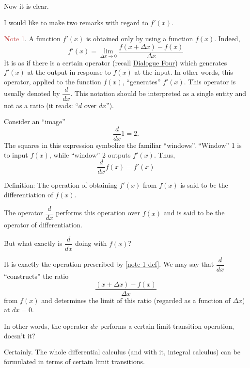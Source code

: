 \rdr Now it is clear.

\athr I would like to make two remarks with regard to $f' (x)$.

\textcolor{IndianRed}{\textbf Note 1}. A function $f' (x)$ is obtained only by using a function  $f (x)$. Indeed,
\begin{equation}%
\boxed{
f' (x) = \lim\limits_{\Delta x \to 0} \frac{f (x + \Delta x) - f(x)}{\Delta x}}
\label{note-1-def}
\end{equation}
It is as if there is a certain operator (recall \hyperref[function]{Dialogue Four}) which generates $f' (x)$ at the output in response to $f (x)$ at the input. In other words, this operator, applied to the function $f (x)$, ``generates'' $f' (x)$. This operator is usually
denoted by $\dfrac{d}{dx}$. This notation should be interpreted as a single entity and not as a ratio (it reads: ``$d$ over $dx$''). 

Consider an ``image''
\begin{equation*}%
\frac{d}{dx} \boxed{1} = \boxed{2}. 
\end{equation*}
The squares in this
expression symbolize the familiar ``windows''. ``Window'' 1 is to input $f (x)$, while ``window'' 2 outputs $f' (x)$. Thus,
\begin{equation}%
\boxed{
\frac{d}{dx}  f (x) = f' (x)}
\label{note-1-def2}
\end{equation}

\begin{mytheo}{Definition:}
The operation of obtaining $f' (x)$ from $f (x)$ is said to be the differentiation of $f (x)$.
\end{mytheo}
The operator $\dfrac{d}{dx}$ performs this operation over $f (x)$ and is said to be the operator of differentiation.

\rdr But what exactly is $\dfrac{d}{dx}$ doing with $f (x)$? 

\athr It is exactly the operation prescribed by \eqref{note-1-def}.
We may say that $\dfrac{d}{dx}$ ``constructs'' the ratio 
\begin{equation*}%
\frac{(x + \Delta x) - f(x)}{ \Delta x}
\end{equation*}
from $f (x)$ and determines the limit of this ratio (regarded as a function of $\Delta x$) at $dx = 0$.

\rdr In other words, the operator $dx$ performs  a certain limit transition operation, doesn't it? 

\athr Certainly. The whole	differential	calculus (and with it, integral calculus) can be formulated in terms of certain limit transitions. 

